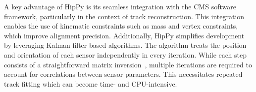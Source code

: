 A key advantage of HipPy is its seamless integration with the CMS software framework, particularly in the context of track reconstruction. This integration enables the use of kinematic constraints such as mass and vertex constraints, which improve alignment precision. Additionally, HipPy simplifies development by leveraging Kalman filter-based algorithms. The algorithm treats the position and orientation of each sensor independently in every iteration. While each step consists of a straightforward matrix inversion~\cite{WAdam_2009, Karimaki:926537}, multiple iterations are required to account for correlations between sensor parameters. This necessitates repeated track fitting which can become time- and CPU-intensive. 







